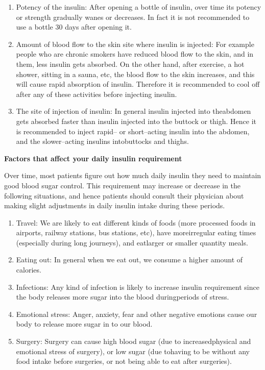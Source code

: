 \begin{enumerate}[•]
\itemsep=0pt
\item Potency of the insulin: After opening a bottle of insulin, over time its potency or strength gradually wanes or decreases. In fact it is not recommended to use a bottle 30 days after opening it.
\item Amount of blood flow to the skin site where insulin is injected: For example people who are chronic smokers have reduced blood flow to the skin, and in them, less insulin gets absorbed. On the other hand, after exercise, a hot shower, sitting in a sauna, etc, the blood flow to the skin increases, and this will cause rapid absorption of insulin. Therefore it is recommended to cool off after any of these activities before injecting insulin.
\item The site of injection of insulin: In general insulin injected into the\break abdomen gets absorbed faster than insulin injected into the buttock or thigh. Hence it is recommended to inject rapid– or short–acting insulin into the abdomen, and the slower–acting insulins into\break buttocks and thighs.
\end{enumerate}

\noindent\textbf{Factors that affect your daily insulin requirement}

Over time, most patients figure out how much daily insulin they need to maintain good blood sugar control. This requirement may increase or decrease in the following situations, and hence patients should consult their physician about making slight adjustments in daily insulin intake during these periods.

\begin{enumerate}[•]
\itemsep=0pt
\item Travel: We are likely to eat different kinds of foods (more processed foods in airports, railway stations, bus stations, etc), have more\break irregular eating times (especially during long journeys), and eat\break larger or smaller quantity meals.
\item Eating out: In general when we eat out, we consume a higher amount of calories.
\item Infections: Any kind of infection is likely to increase insulin requirement since the body releases more sugar into the blood during\break periods of stress.
\item Emotional stress: Anger, anxiety, fear and other negative emotions cause our body to release more sugar in to our blood.
\item Surgery: Surgery can cause high blood sugar (due to increased\break physical and emotional stress of surgery), or low sugar (due to\break having to be without any food intake before surgeries, or not being able to eat after surgeries).
\end{enumerate}

